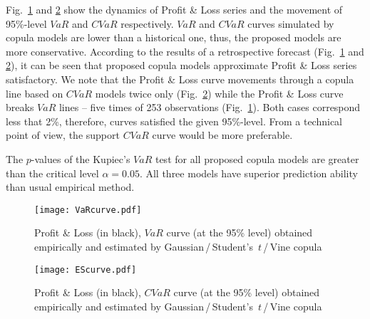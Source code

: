 \documentclass{llncs}
\begin{document}
Fig.~\ref{VaR-curve} and \ref{ES-curve} show the dynamics of Profit \& Loss series and the movement of 95\%-level $VaR$ and $CVaR$ respectively. $VaR$ and $CVaR$ curves simulated by copula models are lower than a historical one, thus, the proposed models are more conservative. %
According to the results of a retrospective forecast (Fig.~\ref{VaR-curve} and \ref{ES-curve}), it can be seen that proposed copula models approximate Profit \& Loss series satisfactory. We note that the Profit \& Loss curve movements through a copula line based on $CVaR$ models twice only (Fig.~\ref{ES-curve}) while the Profit \& Loss curve breaks $VaR$ lines -- five times of 253 observations (Fig.~\ref{VaR-curve}). Both cases correspond less that 2\%, therefore, curves satisfied the given 95\%-level. From a technical point of view, the support $CVaR$ curve would be more preferable.

The $p$-values of the Kupiec's $VaR$ test \cite{Kupiec95} for all proposed copula models are greater than the critical level $\alpha = 0.05$. All three models have superior %
prediction ability than usual empirical method.  %

\begin{figure} %
  \centering
  \texttt{[image: VaRcurve.pdf]}
  \caption{Profit \& Loss (in black), $VaR$ curve (at the 95\% level) obtained empirically and estimated by Gaussian\,/\,Student's~$t$\,/\,Vine copula}
  \label{VaR-curve}%
\end{figure}

\begin{figure} %
  \centering
  \texttt{[image: EScurve.pdf]}
  \caption{Profit \& Loss (in black), $CVaR$ curve (at the 95\% level) obtained empirically and estimated by Gaussian\,/\,Student's~$t$\,/\,Vine copula}
  \label{ES-curve}%
\end{figure}

\end{document}
